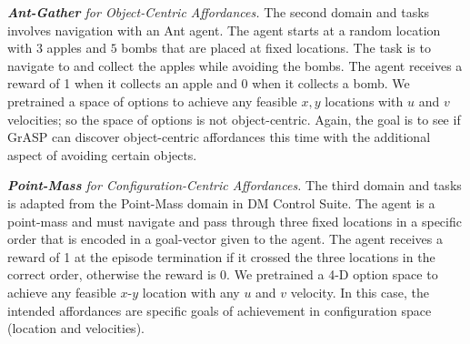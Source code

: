 \documentclass[nohyperref]{article}
\theoremstyle{plain}
\theoremstyle{definition}
\theoremstyle{remark}
\newcommand{\grasp}{{G}r{ASP} }
\begin{document}

\emph{\textbf{Ant-Gather} for Object-Centric Affordances.} The second domain and tasks involves navigation with an Ant agent. The agent starts at a random location  with $3$ apples and $5$ bombs that are placed at fixed locations. The task is to navigate to and collect the apples while avoiding the bombs. The agent receives a reward of 1 when it collects an apple and 0 when it collects a bomb. We pretrained a space of options to achieve any feasible $x,y$ locations with $u$ and $v$ velocities; so the space of options is not object-centric. Again, the goal is to see if \grasp can discover object-centric affordances this time with the additional aspect of avoiding certain objects.

\emph{\textbf{Point-Mass} for Configuration-Centric Affordances.} The third domain and tasks is adapted from the Point-Mass domain in DM Control Suite. The agent is a point-mass and must navigate and pass through three fixed locations  in a specific order that is encoded in a goal-vector given to the agent.
The agent receives a reward of 1 at the episode termination if it crossed the three locations in the correct order, otherwise the reward is 0.
We pretrained a 4-D option space to achieve any feasible $x$-$y$ location with any $u$ and $v$ velocity. %
In this case, the intended affordances are specific goals of achievement in configuration space (location and velocities).
\end{document}

